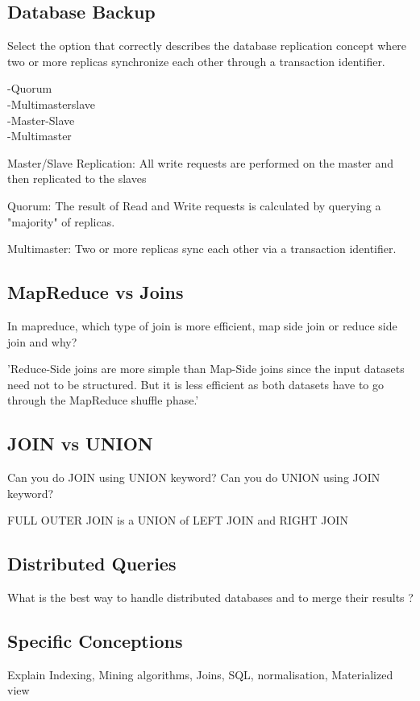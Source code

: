 \subsection{Database Backup}
Select the option that correctly describes the database replication concept where two or more 
replicas synchronize each other through a transaction identifier. 

-Quorum \\
-Multimasterslave \\
-Master-Slave \\
-Multimaster

Master/Slave Replication: All write requests are performed on the master and then replicated to the slaves 

Quorum: The result of Read and Write requests is calculated by querying a "majority" of replicas. 

Multimaster: Two or more replicas sync each other via a transaction identifier.

\subsection{MapReduce vs Joins}
In mapreduce, which type of join is more efficient, map side join or reduce side join and why?

'Reduce-Side joins are more simple than Map-Side joins since the input datasets need not to be structured. But it is less efficient as both datasets have to go through the 
MapReduce shuffle phase.' 

\subsection{JOIN vs UNION}
Can you do JOIN using UNION keyword? Can you do UNION using JOIN keyword? 

FULL OUTER JOIN is a UNION of LEFT JOIN and RIGHT JOIN

\subsection{Distributed Queries}

What is the best way to handle distributed databases and to merge their results ?

\subsection{Specific Conceptions}

Explain Indexing, Mining algorithms, Joins, SQL, normalisation, Materialized view

